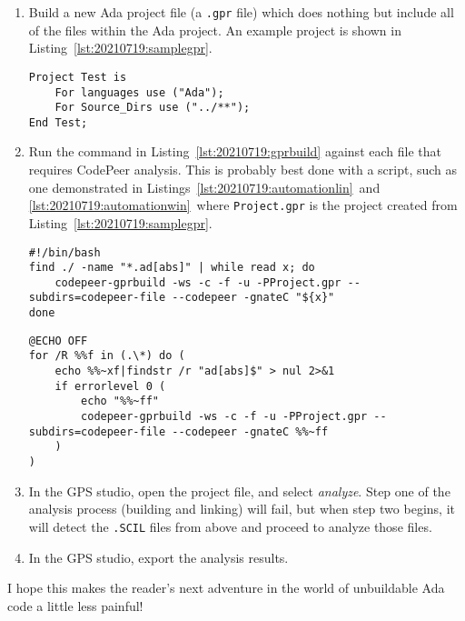 \begin{enumerate}
	\item Build a new Ada project file (a \texttt{.gpr} file) which does nothing but include all of the files within the Ada project. An example project is shown in Listing~\ref{lst:20210719:samplegpr}.
\begin{lstlisting}[caption={All-Inclusive GPR Example},captionpos=b,style=AdaStyle,basicstyle=\small,label={lst:20210719:samplegpr},literate=*{-}{-}1,breaklines=true,upquote=true]
Project Test is
	For languages use ("Ada");
	For Source_Dirs use ("../**");
End Test;
\end{lstlisting}
	\item Run the command in Listing~\ref{lst:20210719:gprbuild} against each file that requires CodePeer analysis. This is probably best done with a script, such as one demonstrated in Listings~\ref{lst:20210719:automationlin}\ and \ref{lst:20210719:automationwin}\ where \texttt{Project.gpr} is the project created from Listing~\ref{lst:20210719:samplegpr}.
\begin{lstlisting}[caption={Bash Script for Ada Single-Build Automation},captionpos=b,style=BashStyle,basicstyle=\small,label={lst:20210719:automationlin},literate=*{-}{-}1
{"}{"}1,breaklines=true]
#!/bin/bash
find ./ -name "*.ad[abs]" | while read x; do
	codepeer-gprbuild -ws -c -f -u -PProject.gpr --subdirs=codepeer-file --codepeer -gnateC "${x}"
done
\end{lstlisting}
\begin{lstlisting}[caption={Batch Script for Ada Single-Build Automation},captionpos=b,style=BashStyle,basicstyle=\small,label={lst:20210719:automationwin},literate=*{-}{-}1
{"}{"}1,breaklines=true]
@ECHO OFF
for /R %%f in (.\*) do (
	echo %%~xf|findstr /r "ad[abs]$" > nul 2>&1
	if errorlevel 0 (
		echo "%%~ff"
		codepeer-gprbuild -ws -c -f -u -PProject.gpr --subdirs=codepeer-file --codepeer -gnateC %%~ff
	)
)
\end{lstlisting}
	\item In the GPS studio, open the project file, and select \textit{analyze}.  Step one of the analysis process (building and linking) will fail, but when step two begins, it will detect the \texttt{.SCIL} files from above and proceed to analyze those files.
	\item In the GPS studio, export the analysis results.
\end{enumerate}

I hope this makes the reader’s next adventure in the world of unbuildable Ada code a little less painful!
